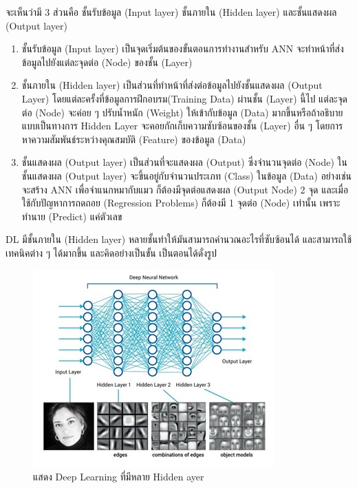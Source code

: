 จะเห็นว่ามี 3 ส่วนคือ ชั้นรับข้อมูล (Input layer) ชั้นภายใน (Hidden layer) และชั้นแสดงผล (Output layer)
\begin{enumerate}
  \item ชั้นรับข้อมูล (Input layer) เป็นจุดเริ่มต้นของขั้นตอนการทำงานสำหรับ ANN จะทำหน้าที่ส่งข้อมูลไปยังแต่ละจุดต่อ (Node) ของชั้น (Layer)
  \item ชั้นภายใน (Hidden layer) เป็นส่วนที่ทำหน้าที่ส่งต่อข้อมูลไปยังชั้นแสดงผล (Output Layer) โดยแต่ละครั้งที่ข้อมูลการฝึกอบรม(Training Data) 
  ผ่านชั้น (Layer) นี้ไป แต่ละจุดต่อ (Node) จะค่อย ๆ ปรับน้ำหนัก (Weight) ให้เข้ากับข้อมูล (Data) มากขึ้นหรือถ้าอธิบายแบบเป็นทางการ 
  Hidden Layer จะคอยกักเก็บความซับซ้อนของชั้น (Layer) อื่น ๆ โดยการหาความสัมพันธ์ระหว่างคุณสมบัติ (Feature) ของข้อมูล (Data)
  \item ชั้นแสดงผล (Output layer) เป็นส่วนที่จะแสดงผล (Output) ซึ่งจำนวนจุดต่อ (Node) ในชั้นแสดงผล (Output layer) จะขึ้นอยู่กับจำนวนประเภท (Class) 
  ในข้อมูล (Data) อย่างเช่นจะสร้าง ANN เพื่อจำแนกหมากับแมว ก็ต้องมีจุดต่อแสดงผล (Output Node) 2 จุด และเมื่อใช้กับปัญหาการถดถอย (Regression Problems) ก็ต้องมี 1 จุดต่อ (Node) เท่านั้น 
  เพราะทำนาย (Predict) แค่ตัวเลข
\end{enumerate}
DL มีชั้นภายใน (Hidden layer) หลายชั้นทำให้มันสามารถคำนวณอะไรที่ซับซ้อนได้ และสามารถใช้เทคนิคต่าง ๆ ได้มากขึ้น และคิดอย่างเป็นขั้น เป็นตอนได้ดั่งรูป \\

\begin{figure}[!ht]
  \begin{center}
    \includegraphics[scale=.9]{pic/deep2.jpg}
    \caption[Poem]{แสดง Deep Learning ที่มีหลาย Hidden ayer}
    \label{fig:deep2}
  \end{center}
\end{figure}

